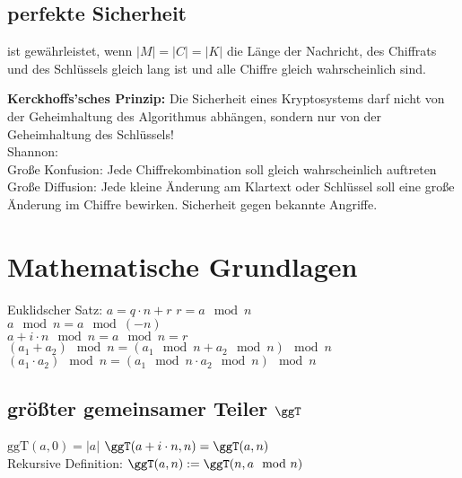 \documentclass[fs]{latex4ei}
\begin{document}
\begin{multicols}{4}
	\subsection{perfekte Sicherheit}
	ist gewährleistet, wenn $|M| = |C| = |K|$
	die Länge der Nachricht, des Chiffrats und des Schlüssels gleich lang ist und alle Chiffre gleich wahrscheinlich sind.


	\textbf{Kerckhoffs'sches Prinzip:} Die Sicherheit eines Kryptosystems darf nicht von der Geheimhaltung des Algorithmus abhängen, sondern nur von der Geheimhaltung des Schlüssels!
	\\
	Shannon:\\
	Große Konfusion: Jede Chiffrekombination soll gleich wahrscheinlich auftreten\\
	Große Diffusion: Jede kleine Änderung am Klartext oder Schlüssel soll eine große Änderung im Chiffre bewirken.
	Sicherheit gegen bekannte Angriffe.\\


\section{Mathematische Grundlagen}

Euklidscher Satz: $a = q \cdot n + r$ \qquad $r = a \mod n$\\
$a \mod n = a \mod (-n)$\\
$a + i\cdot n \mod n = a \mod n = r$\\
$(a_1 + a_2) \mod n = (a_1 \mod n + a_2 \mod n) \mod n$\\
$(a_1 \cdot a_2) \mod n = (a_1 \mod n \cdot a_2 \mod n) \mod n$\\
		
	\subsection{größter gemeinsamer Teiler $\ggT$}
	$\mathrm{ggT}(a,0) = |a|$ \quad	$\ggT(a+i\cdot n,n) = \ggT(a,n)$\\		
	Rekursive Definition: $\ggT(a,n) := \ggT(n,a \mod n)$\\

	

\end{multicols}
\end{document}
